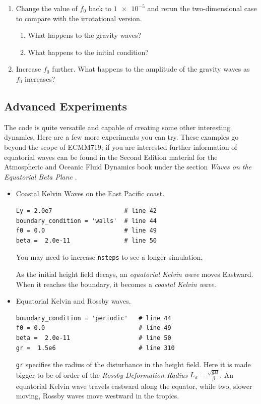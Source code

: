 \documentclass[a4paper, sfsidenotes, twoside]{tufte-handout}
\begin{document}
\begin{itemize}
\begin{enumerate}
      \item Change the value of $f_0$ back to $\num{1e-5}$ and rerun the two-dimensional case to compare with the irrotational version.
      \begin{enumerate}
        \item What happens to the gravity waves?
        \item What happens to the initial condition?
      \end{enumerate}
      \item Increase $f_0$ further.  What happens to the amplitude of the gravity waves as $f_0$ increases?
    \end{enumerate}
  \end{itemize}

\subsection{Advanced Experiments}
\label{sub:advanced}
  The code is quite versatile and capable of creating some other interesting dynamics.
  Here are a few more experiments you can try.
  These examples go beyond the scope of ECMM719; if you are interested further information of equatorial waves can be found in the Second Edition material for the Atmospheric and Oceanic Fluid Dynamics book under the section \emph{Waves on the Equatorial Beta Plane} \cite{Vallis:2015wb}.
    \begin{itemize}
      \item Coastal Kelvin Waves on the East Pacific coast.
      \begin{verbatim}
Ly = 2.0e7                    # line 42
boundary_condition = 'walls'  # line 44
f0 = 0.0                      # line 49
beta =  2.0e-11               # line 50
      \end{verbatim}
      You may need to increase \texttt{nsteps} to see a longer simulation.

      As the initial height field decays, an \emph{equatorial Kelvin wave} moves Eastward.  When it reaches the boundary, it becomes a \emph{coastal Kelvin wave}.
    \item Equatorial Kelvin and Rossby waves.
          \begin{verbatim}
boundary_condition = 'periodic'   # line 44
f0 = 0.0                          # line 49
beta =  2.0e-11                   # line 50
gr =  1.5e6                       # line 310
          \end{verbatim}
        \texttt{gr} specifies the radius of the disturbance in the height field.
        Here it is made bigger to be of order of the \emph{Rossby Deformation Radius} $L_d = \frac{\sqrt{gH}}{\beta}$.
      An equatorial Kelvin wave travels eastward along the equator, while two, slower moving, Rossby waves move westward in the tropics.
    \end{itemize}
\end{document}
